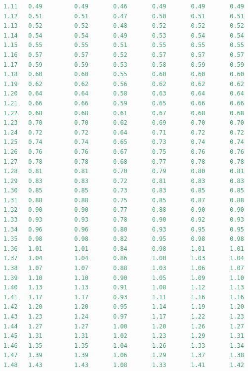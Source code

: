 \documentclass[12pt]{report}
\begin{document}
\begin{lstlisting}[language=Python]
1.11   0.49         0.49       0.46       0.49       0.49       0.49
1.12   0.51         0.51       0.47       0.50       0.51       0.51
1.13   0.52         0.52       0.48       0.52       0.52       0.52
1.14   0.54         0.54       0.49       0.53       0.54       0.54
1.15   0.55         0.55       0.51       0.55       0.55       0.55
1.16   0.57         0.57       0.52       0.57       0.57       0.57
1.17   0.59         0.59       0.53       0.58       0.59       0.59
1.18   0.60         0.60       0.55       0.60       0.60       0.60
1.19   0.62         0.62       0.56       0.62       0.62       0.62
1.20   0.64         0.64       0.58       0.63       0.64       0.64
1.21   0.66         0.66       0.59       0.65       0.66       0.66
1.22   0.68         0.68       0.61       0.67       0.68       0.68
1.23   0.70         0.70       0.62       0.69       0.70       0.70
1.24   0.72         0.72       0.64       0.71       0.72       0.72
1.25   0.74         0.74       0.65       0.73       0.74       0.74
1.26   0.76         0.76       0.67       0.75       0.76       0.76
1.27   0.78         0.78       0.68       0.77       0.78       0.78
1.28   0.81         0.81       0.70       0.79       0.80       0.81
1.29   0.83         0.83       0.72       0.81       0.83       0.83
1.30   0.85         0.85       0.73       0.83       0.85       0.85
1.31   0.88         0.88       0.75       0.85       0.87       0.88
1.32   0.90         0.90       0.77       0.88       0.90       0.90
1.33   0.93         0.93       0.78       0.90       0.92       0.93
1.34   0.96         0.96       0.80       0.93       0.95       0.95
1.35   0.98         0.98       0.82       0.95       0.98       0.98
1.36   1.01         1.01       0.84       0.98       1.01       1.01
1.37   1.04         1.04       0.86       1.00       1.03       1.04
1.38   1.07         1.07       0.88       1.03       1.06       1.07
1.39   1.10         1.10       0.90       1.05       1.09       1.10
1.40   1.13         1.13       0.91       1.08       1.12       1.13
1.41   1.17         1.17       0.93       1.11       1.16       1.16
1.42   1.20         1.20       0.95       1.14       1.19       1.20
1.43   1.23         1.24       0.97       1.17       1.22       1.23
1.44   1.27         1.27       1.00       1.20       1.26       1.27
1.45   1.31         1.31       1.02       1.23       1.29       1.31
1.46   1.35         1.35       1.04       1.26       1.33       1.34
1.47   1.39         1.39       1.06       1.29       1.37       1.38
1.48   1.43         1.43       1.08       1.33       1.41       1.42

\end{lstlisting}
\end{document}
